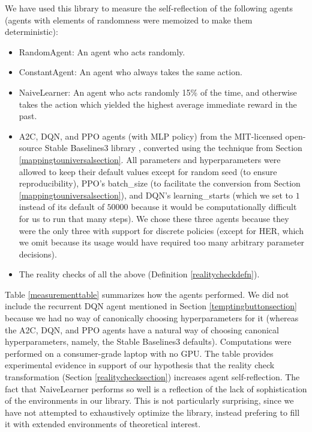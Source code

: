 \documentclass{article}
\begin{document}
We have used this library to measure the self-reflection of the following agents
(agents with elements of randomness were memoized to make them deterministic):
\begin{itemize}
  \item RandomAgent: An agent who acts randomly.
  \item ConstantAgent: An agent who always takes the same action.
  \item NaiveLearner: An agent who acts randomly 15\% of the time, and otherwise
    takes the action which yielded the highest average immediate reward in the past.
  \item A2C, DQN, and PPO agents (with MLP policy)
    from the MIT-licensed open-source Stable Baselines3
    library \cite{stable-baselines3}, converted
    using the technique from Section \ref{mappingtouniversalsection}. All parameters and
    hyperparameters were allowed to keep their default values except for random seed
    (to ensure reproducibility), PPO's batch\_size (to facilitate the conversion
    from Section \ref{mappingtouniversalsection}), and DQN's
    learning\_starts (which we set to $1$ instead of its default of
    $50000$ because it would be computationally difficult for us to run that many steps).
    We chose these three agents because they were the only three with support for
    discrete policies (except for HER, which we omit because its usage would have required
    too many arbitrary parameter decisions).
  \item The reality checks of all the above (Definition \ref{realitycheckdefn}).
\end{itemize}
Table \ref{measurementtable} summarizes how the agents performed.
We did not include the recurrent DQN agent mentioned in Section \ref{temptingbuttonsection}
because we had no way of canonically choosing hyperparameters for it (whereas
the A2C, DQN, and PPO agents have a natural way of choosing canonical hyperparameters,
namely, the Stable Baselines3 defaults).
Computations were performed on a consumer-grade laptop with no GPU.
The table provides
experimental evidence in support of our hypothesis that the reality check transformation
(Section \ref{realitychecksection}) increases agent self-reflection.
The fact that NaiveLearner performs so well is a reflection of the
lack of sophistication of the environments in our library. This is not particularly
surprising, since we have not attempted to exhaustively optimize the library, instead
prefering to fill it with extended environments of theoretical interest.
\end{document}
